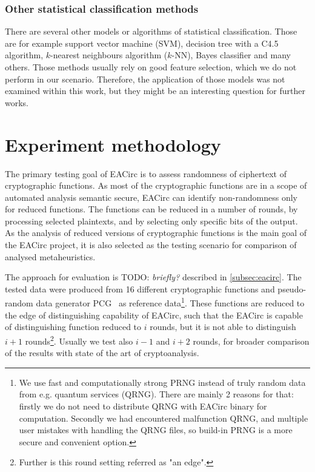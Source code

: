 \documentclass[
  print, %
  Table,   %
  nolof,     %
  nolot,     %
  11pt, %
  oneside  %
]{fithesis3}
\newcommand{\todo}[1]{TODO: \textit{#1}}
\begin{document}

\subsection{Other statistical classification methods}


There are several other models or algorithms of statistical classification. Those are for example support vector machine (SVM), decision tree with a C4.5 algorithm, $k$-nearest neighbours algorithm ($k$-NN), Bayes classifier and many others. Those methods usually rely on good feature selection, which we do not perform in our scenario. Therefore, the application of those models was not examined within this work, but they might be an interesting question for further works.

\chapter{Experiment methodology}
\label{chap:method}

The primary testing goal of EACirc is to assess randomness of ciphertext of cryptographic functions. As most of the cryptographic functions are in a scope of automated analysis semantic secure, EACirc can identify non-randomness only for reduced functions. The functions can be reduced in a number of rounds, by processing selected plaintexts, and by selecting only specific bits of the output. As the analysis of reduced versions of cryptographic functions is the main goal of the EACirc project, it is also selected as the testing scenario for comparison of analysed metaheuristics.

The approach for evaluation is \todo{briefly?} described in \cref{subsec:eacirc}. The tested data were produced from 16 different cryptographic functions and pseudo-random data generator PCG~\cite{pcgGen} as reference data\footnote{We use fast and computationally strong PRNG instead of truly random data from e.g. quantum services (QRNG). There are mainly 2 reasons for that: firstly we do not need to distribute QRNG with EACirc binary for computation. Secondly we had encountered malfunction QRNG, and multiple user mistakes with handling the QRNG files, so build-in PRNG is a more secure and convenient option.}. These functions are reduced to the edge of distinguishing capability of EACirc, such that the EACirc is capable of distinguishing function reduced to $i$ rounds, but it is not able to distinguish $i+1$ rounds\footnote{Further is this round setting referred as "an edge".}. Usually we test also $i-1$ and $i+2$ rounds, for broader comparison of the results with state of the art of cryptoanalysis.
\end{document}

